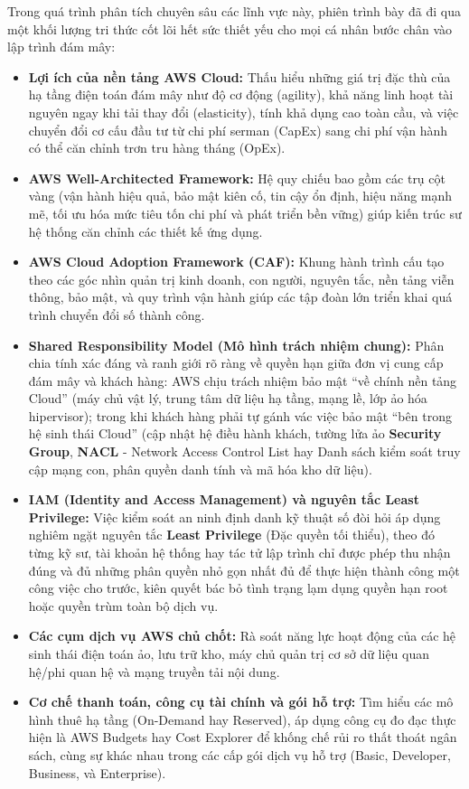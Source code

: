 Trong quá trình phân tích chuyên sâu các lĩnh vực này, phiên trình bày
đã đi qua một khối lượng tri thức cốt lõi hết sức thiết yếu cho mọi cá
nhân bước chân vào lập trình đám mây:

\begin{itemize}
\tightlist
\item
  \textbf{Lợi ích của nền tảng AWS Cloud:} Thấu hiểu những giá trị đặc
  thù của hạ tầng điện toán đám mây như độ cơ động (agility), khả năng
  linh hoạt tài nguyên ngay khi tải thay đổi (elasticity), tính khả dụng
  cao toàn cầu, và việc chuyển đổi cơ cấu đầu tư từ chi phí serman
  (CapEx) sang chi phí vận hành có thể căn chỉnh trơn tru hàng tháng
  (OpEx).
\item
  \textbf{AWS Well-Architected Framework:} Hệ quy chiếu bao gồm các trụ
  cột vàng (vận hành hiệu quả, bảo mật kiên cố, tin cậy ổn định, hiệu
  năng mạnh mẽ, tối ưu hóa mức tiêu tốn chi phí và phát triển bền vững)
  giúp kiến trúc sư hệ thống căn chỉnh các thiết kế ứng dụng.
\item
  \textbf{AWS Cloud Adoption Framework (CAF):} Khung hành trình cấu tạo
  theo các góc nhìn quản trị kinh doanh, con người, nguyên tắc, nền tảng
  viễn thông, bảo mật, và quy trình vận hành giúp các tập đoàn lớn triển
  khai quá trình chuyển đổi số thành công.
\item
  \textbf{Shared Responsibility Model (Mô hình trách nhiệm chung):} Phân
  chia tính xác đáng và ranh giới rõ ràng về quyền hạn giữa đơn vị cung
  cấp đám mây và khách hàng: AWS chịu trách nhiệm bảo mật ``về chính nền
  tảng Cloud'' (máy chủ vật lý, trung tâm dữ liệu hạ tầng, mạng lề, lớp
  ảo hóa hipervisor); trong khi khách hàng phải tự gánh vác việc bảo mật
  ``bên trong hệ sinh thái Cloud'' (cập nhật hệ điều hành khách, tường
  lửa ảo \textbf{Security Group}, \textbf{NACL} - Network Access Control
  List hay Danh sách kiểm soát truy cập mạng con, phân quyền danh tính
  và mã hóa kho dữ liệu).
\item
  \textbf{IAM (Identity and Access Management) và nguyên tắc Least
  Privilege:} Việc kiểm soát an ninh định danh kỹ thuật số đòi hỏi áp
  dụng nghiêm ngặt nguyên tắc \textbf{Least Privilege} (Đặc quyền tối
  thiểu), theo đó từng kỹ sư, tài khoản hệ thống hay tác tử lập trình
  chỉ được phép thu nhận đúng và đủ những phân quyền nhỏ gọn nhất đủ để
  thực hiện thành công một công việc cho trước, kiên quyết bác bỏ tình
  trạng lạm dụng quyền hạn root hoặc quyền trùm toàn bộ dịch vụ.
\item
  \textbf{Các cụm dịch vụ AWS chủ chốt:} Rà soát năng lực hoạt động của
  các hệ sinh thái điện toán ảo, lưu trữ kho, máy chủ quản trị cơ sở dữ
  liệu quan hệ/phi quan hệ và mạng truyền tải nội dung.
\item
  \textbf{Cơ chế thanh toán, công cụ tài chính và gói hỗ trợ:} Tìm hiểu
  các mô hình thuê hạ tầng (On-Demand hay Reserved), áp dụng công cụ đo
  đạc thực hiện là AWS Budgets hay Cost Explorer để khống chế rủi ro
  thất thoát ngân sách, cùng sự khác nhau trong các cấp gói dịch vụ hỗ
  trợ (Basic, Developer, Business, và Enterprise).
\end{itemize}


